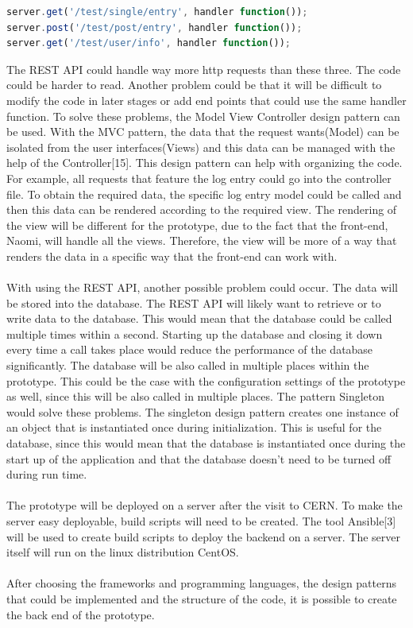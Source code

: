 \documentclass[paper=a4, fontsize=11pt,twoside]{scrartcl}	%
\begin{document}
\begin{lstlisting}[language=JavaScript, frame=single]
server.get('/test/single/entry', handler function());
server.post('/test/post/entry', handler function());
server.get('/test/user/info', handler function());
\end{lstlisting} 
The REST API could handle way more http requests than these three. The code could be harder to read. Another problem could be that it will be difficult to modify the code in later stages or add end points that could use the same handler function. To solve these problems, the Model View Controller design pattern can be used. With the MVC pattern, the data that the request wants(Model) can be isolated from the user interfaces(Views) and this data can be managed with the help of the Controller[15]. This design pattern can help with organizing the code. For example, all requests that feature the log entry could go into the controller file. To obtain the required data, the specific log entry model could be called and then this data can be rendered according to the required view. The rendering of the view will be different for the prototype, due to the fact that the front-end, Naomi, will handle all the views. Therefore, the view will be more of a way that renders the data in a specific way that the front-end can work with.\\ \\
With using the REST API, another possible problem could occur. The data will be stored into the database. The REST API will likely want to retrieve or to write data to the database. This would mean that the database could be called multiple times within a second. Starting up the database and closing it down every time a call takes place would reduce the performance of the database significantly. The database will be also called in multiple places within the prototype. This could be the case with the configuration settings of the prototype as well, since this will be also called in multiple places. The pattern Singleton would solve these problems. The singleton design pattern creates one instance of an object that is instantiated once during initialization. This is useful for the database, since this would mean that the database is instantiated once during the start up of the application and that the database doesn't need to be turned off during run time. \\ \\
The prototype will be deployed on a server after the visit to CERN. To make the server easy deployable, build scripts will need to be created. The tool Ansible[3] will be used to create build scripts to deploy the backend on a server. The server itself will run on the linux distribution CentOS.   \\ \\
After choosing the frameworks and programming languages, the design patterns that could be implemented and the structure of the code, it is possible to create the back end of the prototype.   
\end{document}
